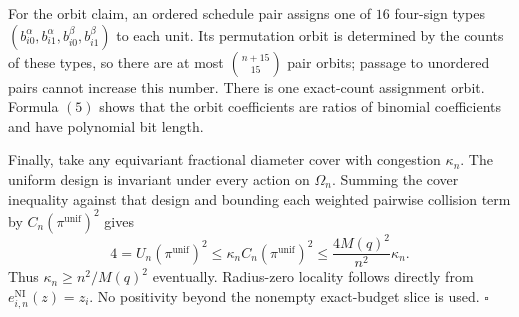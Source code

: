 For the orbit claim, an ordered schedule pair assigns one of \(16\) four-sign types
\((b_{i0}^\alpha,b_{i1}^\alpha,b_{i0}^\beta,b_{i1}^\beta)\) to each unit. Its permutation orbit is determined by the counts of these types, so there are at most \(\binom{n+15}{15}\) pair orbits; passage to unordered pairs cannot increase this number. There is one exact-count assignment orbit. Formula \((5)\) shows that the orbit coefficients are ratios of binomial coefficients and have polynomial bit length.

Finally, take any equivariant fractional diameter cover with congestion \(\kappa_n\). The uniform design is invariant under every action on \(\Omega_n\). Summing the cover inequality against that design and bounding each weighted pairwise collision term by \(C_n(\pi^{\mathrm{unif}})^2\) gives
\[
 4=U_n(\pi^{\mathrm{unif}})^2
 \le\kappa_n C_n(\pi^{\mathrm{unif}})^2
 \le\frac{4M(q)^2}{n^2}\kappa_n. \tag{10}
\]
Thus \(\kappa_n\ge n^2/M(q)^2\) eventually. Radius-zero locality follows directly from \(e^{\mathrm{NI}}_{i,n}(z)=z_i\). No positivity beyond the nonempty exact-budget slice is used. \(\square\)